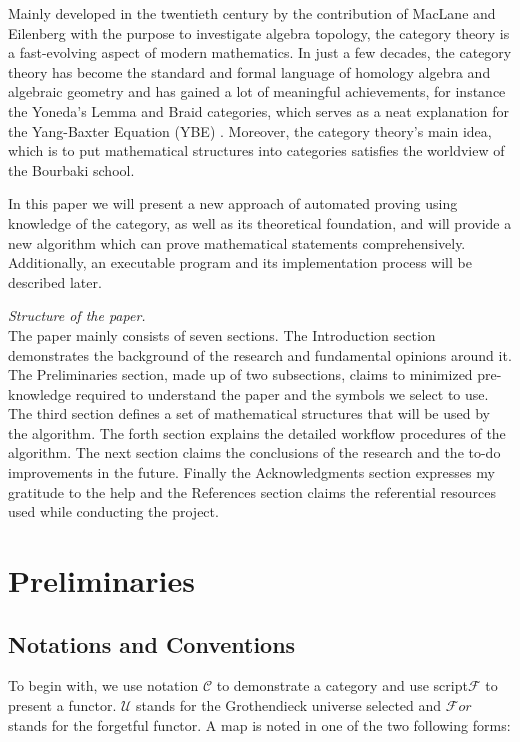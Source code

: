 \documentclass{aims}
\numberwithin{theorem}{section}	%
\numberwithin{axiom}{section}	%
\numberwithin{definition}{section}	%
\begin{document}
Mainly developed in the twentieth century by the contribution of MacLane and Eilenberg with the purpose to investigate algebra topology, the category theory is a fast-evolving aspect of modern mathematics. In just a few decades, the category theory has become the standard and formal language of homology algebra and algebraic geometry and has gained a lot of meaningful achievements, for instance the Yoneda{'}s Lemma and Braid categories, which serves as a neat explanation for the Yang-Baxter Equation (YBE) \cite{Li2019}. Moreover, the category theory{'}s main idea, which is to put mathematical structures into categories satisfies the worldview of the Bourbaki school.

In this paper we will present a new approach of automated proving using knowledge of the category, as well as its theoretical foundation, and will provide a new algorithm which can prove mathematical statements comprehensively. Additionally, an executable program and its implementation process will be described later.

\textit{ Structure of the paper.}\\
The paper mainly consists of seven sections. The Introduction section demonstrates the background of the research and fundamental opinions around it. The Preliminaries section, made up of two subsections, claims to minimized pre-knowledge required to understand the paper and the symbols we select to use. The third section defines a set of mathematical structures that will be used by the algorithm. The forth section explains the detailed workflow procedures of the algorithm. The next section claims the conclusions of the research and the to-do improvements in the future. Finally the Acknowledgments section expresses my gratitude to the help and the References section claims the referential resources used while conducting the project.

\section{Preliminaries}

\subsection{Notations and Conventions}

To begin with, we use notation \(\mathcal{C}\) to demonstrate a category and use script\(\mathcal{F}\) to present a functor. \(\mathcal{U}\) stands for the Grothendieck universe selected and \(\mathcal{F}\mathit{o}\mathit{r}\) stands for the forgetful functor. A map is noted in one of the two following forms:
\end{document}
